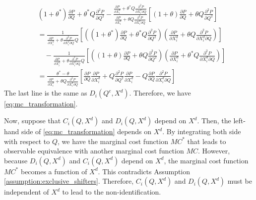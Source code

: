 \documentclass[11pt, a4paper]{article}
\theoremstyle{remark}
\begin{document}
\begin{align}
    & (1+ \theta^{*})\frac{\partial P}{\partial Q} + \theta^{*} Q\frac{\partial^2 P}{\partial Q^2} - \frac{\frac{\partial P}{\partial X^{d}_i} + \theta^{*} Q\frac{\partial^2 P}{\partial X^{d}_{i}\partial Q} }{\frac{\partial P}{\partial X^{d}_i} + \theta Q\frac{\partial^2 P}{\partial X^{d}_{i}\partial Q} }\left[(1+ \theta) \frac{\partial P}{\partial Q} + \theta Q\frac{\partial^2 P}{\partial Q^2}\right]\\
    &= \frac{1}{\frac{\partial P}{\partial X^{d}_i} + \theta\frac{\partial^2 P}{\partial X^{d}_{i}\partial Q}Q}\left[\left((1 + \theta^{*}) \frac{\partial P}{\partial Q} + \theta^{*} Q\frac{\partial^2 P}{\partial  Q^2}\right)\left(\frac{\partial P}{\partial X^{d}_i} + \theta Q\frac{\partial^2 P}{\partial X^{d}_{i}\partial Q}\right)\right]\\
    &\quad - \frac{1}{\frac{\partial P}{\partial X^{d}_i} + \theta\frac{\partial^2 P}{\partial X^{d}_{i}\partial Q}Q}\left[\left( (1 + \theta) \frac{\partial P}{\partial Q} + \theta Q\frac{\partial^2 P}{\partial Q^2}\right)\left(\frac{\partial P}{\partial X^{d}_i} + \theta^{*} Q\frac{\partial^2 P}{\partial X^{d}_{i}\partial Q}\right)\right]\\
    & = \frac{\theta^{*} - \theta}{\frac{\partial P}{\partial X^{d}_i} + \theta Q\frac{\partial^2 P}{\partial X^{d}_{i}\partial Q}}\left[\frac{\partial P}{\partial Q} \frac{\partial P}{\partial X^{d}_i} + Q\frac{\partial^2 P}{\partial Q^2} \frac{\partial P}{\partial X^{d}_i} - Q \frac{\partial P}{\partial Q} \frac{\partial^2 P}{\partial X^{d}_i\partial Q} \right]
\end{align}
The last line is the same as $D_i(Q^e, X^{d})$.
Therefore, we have \eqref{eq:mc_transformation}.

Now, suppose that $C_i(Q, X^{d})$ and $D_i(Q, X^{d})$ depend on $X^{d}$.
Then, the left-hand side of \eqref{eq:mc_transformation} depends on $X^{d}$.
By integrating both side with respect to $Q$, we have the marginal cost function $MC^{*}$ that leads to observable equivalence with another marginal cost function $MC$.
However, because $D_i(Q, X^{d})$ and $C_i(Q, X^{d})$ depend on $X^{d}$, the marginal cost function $MC^{*}$ becomes a function of $X^{d}$.
This contradicts Assumption \ref{assumption:exclusive_shifters}.
Therefore, $C_i(Q, X^{d})$ and $D_i(Q, X^{d})$ must be independent of $X^{d}$ to lead to the non-identification.
\end{document}
